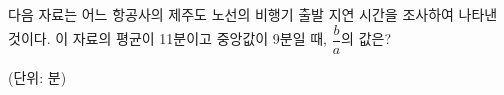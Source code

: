 다음 자료는 어느 항공사의 제주도 노선의 비행기 출발 지연 시간을 조사하여 나타낸 것이다. 이 자료의 평균이 11분이고 중앙값이 9분일 때, $\dfrac{b}{a}$의 값은? \par\noindent\hfill{\footnotesize (단위: 분)}
